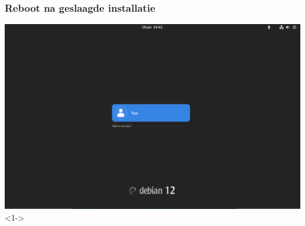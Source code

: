 \documentclass{beamer}
\begin{document}
\begin{frame}
   \frametitle{Reboot na geslaagde installatie}
    \centering
    \includegraphics[width=\textwidth]{img/geslaagde-gnome-installatie.png}<1->
    
\end{frame}
\end{document}
